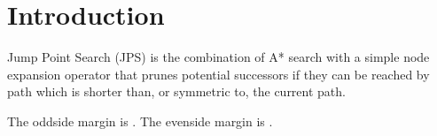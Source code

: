 \section{Introduction}
\label{sec::introduction}
Jump Point Search (JPS) is the combination of A* search with a simple
node expansion operator that prunes potential successors if
they can be reached by path which is shorter than, or symmetric to,
the current path.

The oddside margin is {\the\oddsidemargin}. The evenside margin is {\the\evensidemargin}.
